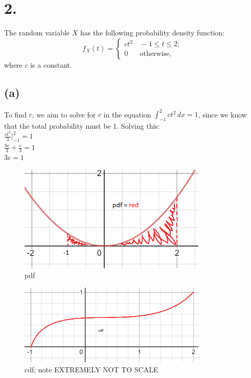 \documentclass{article}
\begin{document}
\thispagestyle{firstpageheader}

\section*{2.}
{\Large
The random variable $X$ has the following probability density function:
\[
f_X\left(t\right)=\begin{cases}
ct^{2} & \,-1\le t\le2;\\
0 & \,\mbox{otherwise,}
\end{cases}
\]
where $c$ is a constant.

\subsection*{(a)}
To find $c$, we aim to solve for $c$ in the equation $\int_{-1}^{2}  ct^2\,dx = 1$, since we know that the total probability must be 1. Solving this: \\ 
$\frac{ct^3}{3}|_{-1}^{2} = 1$ \\ 
$\frac{8c}{3} + \frac{c}{3} = 1$ \\ 
$3c = 1$ \\ 

\begin{figure}[ht!]
  \centering
  \includegraphics[width=90mm]{pdf.PNG}
  \caption{pdf \label{overflow}}
\end{figure}

\begin{figure}[ht!]
  \centering
  \includegraphics[width=90mm]{cdf.PNG}
  \caption{cdf; note EXTREMELY NOT TO SCALE \label{overflow}}
\end{figure}

}
\end{document}
